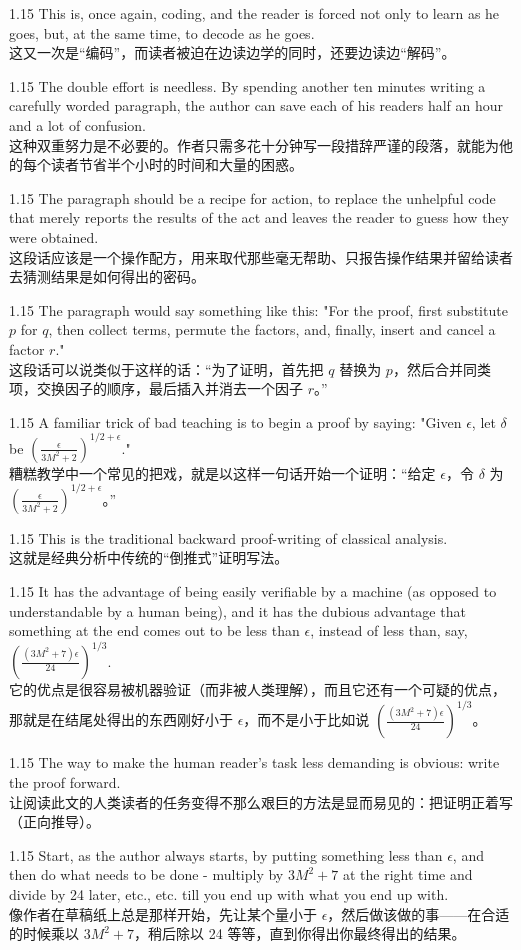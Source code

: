 \documentclass[12pt,a4paper]{article}
\newcommand{\bilingual}[2]{
    \begin{spacing}{1.15} %
        \noindent \normalsize #1 \\[-0.5ex] %
        \small \textcolor{blue!70!black}{#2} %
    \end{spacing}
    \vspace{0.8em} %
}
\begin{document}
\bilingual{This is, once again, coding, and the reader is forced not only to learn as he goes, but, at the same time, to decode as he goes.}
{这又一次是“编码”，而读者被迫在边读边学的同时，还要边读边“解码”。} %

\bilingual{The double effort is needless. By spending another ten minutes writing a carefully worded paragraph, the author can save each of his readers half an hour and a lot of confusion.}
{这种双重努力是不必要的。作者只需多花十分钟写一段措辞严谨的段落，就能为他的每个读者节省半个小时的时间和大量的困惑。} %

\bilingual{The paragraph should be a recipe for action, to replace the unhelpful code that merely reports the results of the act and leaves the reader to guess how they were obtained.}
{这段话应该是一个操作配方，用来取代那些毫无帮助、只报告操作结果并留给读者去猜测结果是如何得出的密码。} %

\bilingual{The paragraph would say something like this: "For the proof, first substitute $p$ for $q$, then collect terms, permute the factors, and, finally, insert and cancel a factor $r$."}
{这段话可以说类似于这样的话：“为了证明，首先把 $q$ 替换为 $p$，然后合并同类项，交换因子的顺序，最后插入并消去一个因子 $r$。”} %

\bilingual{A familiar trick of bad teaching is to begin a proof by saying: "Given $\epsilon$, let $\delta$ be $(\frac{\epsilon}{3M^{2}+2})^{1/2+\epsilon}$."}
{糟糕教学中一个常见的把戏，就是以这样一句话开始一个证明：“给定 $\epsilon$，令 $\delta$ 为 $(\frac{\epsilon}{3M^{2}+2})^{1/2+\epsilon}$。”} %

\bilingual{This is the traditional backward proof-writing of classical analysis.}
{这就是经典分析中传统的“倒推式”证明写法。} %

\bilingual{It has the advantage of being easily verifiable by a machine (as opposed to understandable by a human being), and it has the dubious advantage that something at the end comes out to be less than $\epsilon$, instead of less than, say, $(\frac{(3M^{2}+7)\epsilon}{24})^{1/3}$.}
{它的优点是很容易被机器验证（而非被人类理解），而且它还有一个可疑的优点，那就是在结尾处得出的东西刚好小于 $\epsilon$，而不是小于比如说 $(\frac{(3M^{2}+7)\epsilon}{24})^{1/3}$。} %

\bilingual{The way to make the human reader's task less demanding is obvious: write the proof forward.}
{让阅读此文的人类读者的任务变得不那么艰巨的方法是显而易见的：把证明正着写（正向推导）。} %

\bilingual{Start, as the author always starts, by putting something less than $\epsilon$, and then do what needs to be done - multiply by $3M^{2}+7$ at the right time and divide by 24 later, etc., etc. till you end up with what you end up with.}
{像作者在草稿纸上总是那样开始，先让某个量小于 $\epsilon$，然后做该做的事——在合适的时候乘以 $3M^{2}+7$，稍后除以 24 等等，直到你得出你最终得出的结果。} %
\end{document}
